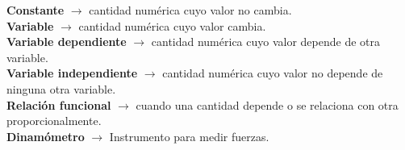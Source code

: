 \begin{defcard}
    \textbf{Constante} $\rightarrow$ cantidad numérica cuyo valor no cambia.\\
    \textbf{Variable} $\rightarrow$ cantidad numérica cuyo valor cambia.\\
    \textbf{Variable dependiente} $\rightarrow$ cantidad numérica cuyo valor depende de otra variable.\\
    \textbf{Variable independiente} $\rightarrow$ cantidad numérica cuyo valor no depende de ninguna otra variable.\\
    \textbf{Relación funcional} $\rightarrow$ cuando una cantidad depende o se relaciona con otra proporcionalmente.\\
    \textbf{Dinamómetro} $\rightarrow$ Instrumento para medir fuerzas.\\
\end{defcard}